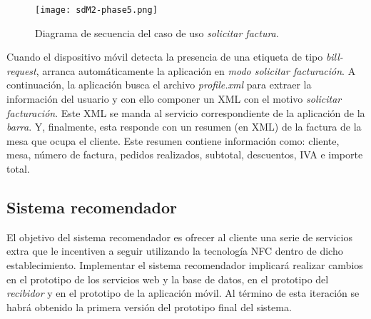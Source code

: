 \begin{itemize}
  \begin{figure}[!h]
    \begin{center}
      \texttt{[image: sdM2-phase5.png]}
      \caption{Diagrama de secuencia del caso de uso \emph{solicitar factura}.}
      \label{fig:sdM2-phase5}
    \end{center}
  \end{figure}

Cuando el dispositivo móvil detecta la presencia de una etiqueta de tipo
\emph{bill-request}, arranca automáticamente la aplicación en \emph{modo
solicitar facturación}. A continuación, la aplicación busca el archivo
\emph{profile.xml} para extraer la información del usuario y con ello componer
un \acs{XML} con el motivo \emph{solicitar facturación}. Este \acs{XML} se
manda al servicio correspondiente de la aplicación de la \emph{barra}. Y,
finalmente, esta responde con un resumen (en \acs{XML}) de la factura de la 
mesa que ocupa el cliente. Este resumen contiene información como: cliente, 
mesa, número de factura, pedidos realizados, subtotal, descuentos, IVA e
importe total.
\end{itemize}

\subsection{Sistema recomendador}
El objetivo del sistema recomendador es ofrecer al cliente una serie de
servicios extra que le incentiven a seguir utilizando la tecnología \acs{NFC}
dentro de dicho establecimiento. Implementar el sistema recomendador implicará
realizar cambios en el prototipo de los servicios web y la base de datos, en
el prototipo del \emph{recibidor} y en el prototipo de la aplicación móvil.
Al término de esta iteración se habrá obtenido la primera versión del prototipo
final del sistema.

